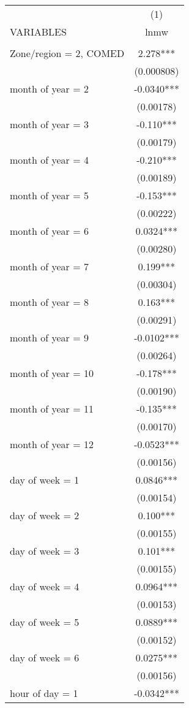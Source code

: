 \begin{tabular}{lc} \hline
 & (1) \\
VARIABLES & lnmw \\ \hline
 &  \\
Zone/region = 2, COMED & 2.278*** \\
 & (0.000808) \\
month of year = 2 & -0.0340*** \\
 & (0.00178) \\
month of year = 3 & -0.110*** \\
 & (0.00179) \\
month of year = 4 & -0.210*** \\
 & (0.00189) \\
month of year = 5 & -0.153*** \\
 & (0.00222) \\
month of year = 6 & 0.0324*** \\
 & (0.00280) \\
month of year = 7 & 0.199*** \\
 & (0.00304) \\
month of year = 8 & 0.163*** \\
 & (0.00291) \\
month of year = 9 & -0.0102*** \\
 & (0.00264) \\
month of year = 10 & -0.178*** \\
 & (0.00190) \\
month of year = 11 & -0.135*** \\
 & (0.00170) \\
month of year = 12 & -0.0523*** \\
 & (0.00156) \\
day of week = 1 & 0.0846*** \\
 & (0.00154) \\
day of week = 2 & 0.100*** \\
 & (0.00155) \\
day of week = 3 & 0.101*** \\
 & (0.00155) \\
day of week = 4 & 0.0964*** \\
 & (0.00153) \\
day of week = 5 & 0.0889*** \\
 & (0.00152) \\
day of week = 6 & 0.0275*** \\
 & (0.00156) \\
hour of day = 1 & -0.0342*** \\

\end{tabular}
